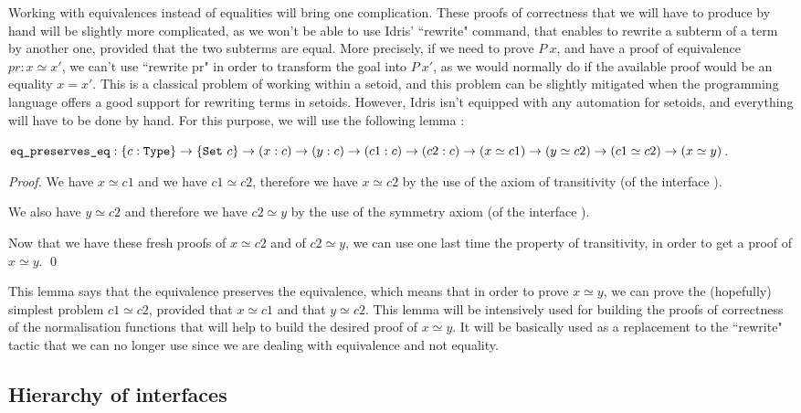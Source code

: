 Working with equivalences instead of equalities will bring one complication. These proofs of correctness that we will have to produce by hand will be slightly more complicated, as we won't be able to use Idris' ``rewrite" command, that enables to rewrite a subterm of a term by another one, provided that the two subterms are equal. More precisely, if we need to prove $P\ x$, and have a proof of equivalence $pr:x \simeq x'$, we can't use ``rewrite pr" in order to transform the goal into $P\ x'$, as we would normally do if the available proof would be an equality $x=x'$. This is a classical problem of working within a setoid, and this problem can be slightly mitigated when the programming language offers a good support for rewriting terms in setoids. However, Idris isn't equipped with any automation for setoids, and everything will have to be done by hand. For this purpose, we will use the following lemma :

${\mbox{\texttt{eq\_preserves\_eq}}} : \{c:{\mbox{\texttt{Type}}}\} \rightarrow \{{\mbox{\texttt{Set}}}\ c\} \rightarrow (x:c) \rightarrow (y:c) \rightarrow (c1:c) \rightarrow (c2:c) \rightarrow (x \simeq c1) \rightarrow (y \simeq c2) \rightarrow (c1 \simeq c2) \rightarrow (x \simeq y)$.

\begin{proof}
We have $x \simeq c1$ and we have $c1 \simeq c2$, therefore we have $x \simeq c2$ by the use of the axiom of transitivity (of the interface ). \

We also have $y \simeq c2$ and therefore we have $c2 \simeq y$ by the use of the symmetry axiom (of the interface ). \

Now that we have these fresh proofs of $x \simeq c2$ and of $c2 \simeq y$, we can use one last time the property of transitivity, in order to get a proof of $x \simeq y$.
\qed
\end{proof}

This lemma says that the equivalence preserves the equivalence, which means that in order to prove $x \simeq y$, we can prove the (hopefully) simplest problem $c1 \simeq c2$, provided that $x \simeq c1$ and that $y \simeq c2$. This lemma will be intensively used for building the proofs of correctness of the normalisation functions that will help to build the desired proof of $x \simeq y$. It will be basically used as a replacement to the ``rewrite" tactic that we can no longer use since we are dealing with equivalence and not equality.

		\subsection{Hierarchy of interfaces}

